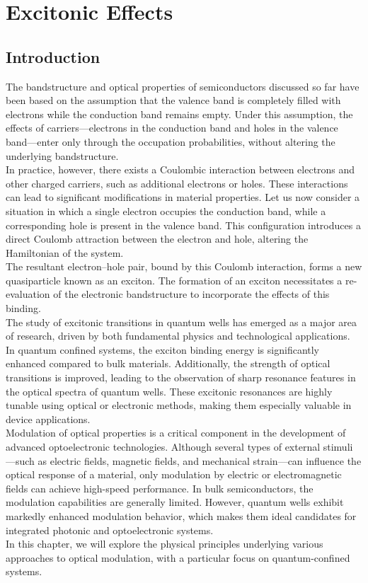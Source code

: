 \chapter{Excitonic Effects}
\section{Introduction}
The bandstructure and optical properties of semiconductors discussed so far have been based on the assumption that the valence band is completely filled with electrons while the conduction band remains empty. Under this assumption, the effects of carriers—electrons in the conduction band and holes in the valence band—enter only through the occupation probabilities, without altering the underlying bandstructure.\\
In practice, however, there exists a Coulombic interaction between electrons and other charged carriers, such as additional electrons or holes. These interactions can lead to significant modifications in material properties. Let us now consider a situation in which a single electron occupies the conduction band, while a corresponding hole is present in the valence band. This configuration introduces a direct Coulomb attraction between the electron and hole, altering the Hamiltonian of the system.\\
The resultant electron–hole pair, bound by this Coulomb interaction, forms a new quasiparticle known as an exciton. The formation of an exciton necessitates a re-evaluation of the electronic bandstructure to incorporate the effects of this binding.\\
The study of excitonic transitions in quantum wells has emerged as a major area of research, driven by both fundamental physics and technological applications. In quantum confined systems, the exciton binding energy is significantly enhanced compared to bulk materials. Additionally, the strength of optical transitions is improved, leading to the observation of sharp resonance features in the optical spectra of quantum wells. These excitonic resonances are highly tunable using optical or electronic methods, making them especially valuable in device applications.\\
Modulation of optical properties is a critical component in the development of advanced optoelectronic technologies. Although several types of external stimuli—such as electric fields, magnetic fields, and mechanical strain—can influence the optical response of a material, only modulation by electric or electromagnetic fields can achieve high-speed performance. In bulk semiconductors, the modulation capabilities are generally limited. However, quantum wells exhibit markedly enhanced modulation behavior, which makes them ideal candidates for integrated photonic and optoelectronic systems.\\
In this chapter, we will explore the physical principles underlying various approaches to optical modulation, with a particular focus on quantum-confined systems.


